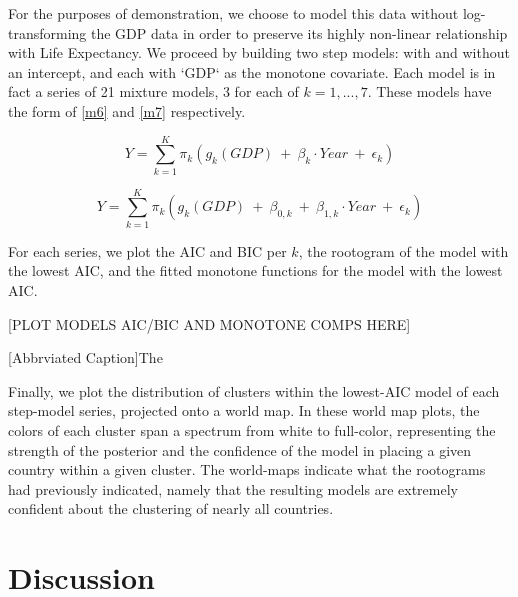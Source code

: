 \documentclass[fleqn,10pt]{olplainarticle}\usepackage[]{graphicx}\usepackage[]{color}
\begin{document}
For the purposes of demonstration, we choose to model this data without log-transforming the GDP data in order to preserve its highly non-linear relationship with Life Expectancy. We proceed by building two step models: with and without an intercept, and each with `GDP` as the monotone covariate. Each model is in fact a series of 21 mixture models, 3 for each of $k = 1,...,7$. These models have the form of \ref{m6} and \ref{m7} respectively.

\begin{equation} \label{m6}
  Y = \sum_{k=1}^{K}\pi_k (g_{k} (GDP) \ +\  \beta_{k}\cdot Year \ +\ \epsilon_k)
\end{equation}

\begin{equation} \label{m7}
  Y = \sum_{k=1}^{K}\pi_k (g_{k} (GDP) \ +\  \beta_{0,k} \ +\ \beta_{1,k}\cdot Year \ +\ \epsilon_k)
\end{equation}

For each series, we plot the AIC and BIC per $k$, the rootogram of the model with the lowest AIC, and the fitted monotone functions for the model with the lowest AIC.


[PLOT MODELS AIC/BIC AND MONOTONE COMPS HERE]








\begin{minipage}{0.8\textwidth}

[Abbrviated Caption]{The }
\end{minipage}



 

Finally, we plot the distribution of clusters within the lowest-AIC model of each step-model series, projected onto a world map. In these world map plots, the colors of each cluster span a spectrum from white to full-color, representing the strength of the posterior and the confidence of the model in placing a given country within a given cluster. The world-maps indicate what the rootograms had previously indicated, namely that the resulting models are extremely confident about the clustering of nearly all countries.











\section{Discussion}
\end{document}
